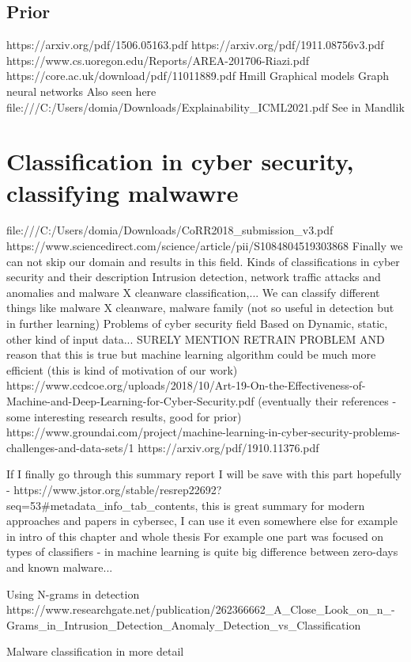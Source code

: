 \subsection{Prior}
https://arxiv.org/pdf/1506.05163.pdf
https://arxiv.org/pdf/1911.08756v3.pdf
https://www.cs.uoregon.edu/Reports/AREA-201706-Riazi.pdf
https://core.ac.uk/download/pdf/11011889.pdf
Hmill
Graphical models
Graph neural networks
    Also seen here file:///C:/Users/domia/Downloads/Explainability_ICML2021.pdf
See in Mandlik

\section{Classification in cyber security, classifying malwawre}
file:///C:/Users/domia/Downloads/CoRR2018_submission_v3.pdf
https://www.sciencedirect.com/science/article/pii/S1084804519303868
Finally we can not skip our domain and results in this field. 
Kinds of classifications in cyber security and their description
Intrusion detection, network traffic attacks and anomalies and malware X cleanware classification,...
We can classify different things like malware X cleanware, malware family (not so useful in detection but in further learning)
Problems of cyber security field
Based on Dynamic, static, other kind of input data...
SURELY MENTION RETRAIN PROBLEM AND reason that this is true but machine learning algorithm could be much more efficient (this is kind of motivation of our work)
https://www.ccdcoe.org/uploads/2018/10/Art-19-On-the-Effectiveness-of-Machine-and-Deep-Learning-for-Cyber-Security.pdf (eventually their references - some interesting research results, good for prior)
https://www.groundai.com/project/machine-learning-in-cyber-security-problems-challenges-and-data-sets/1
https://arxiv.org/pdf/1910.11376.pdf

If I finally go through this summary report I will be save with this part hopefully - https://www.jstor.org/stable/resrep22692?seq=53#metadata_info_tab_contents, this is great summary for modern approaches and papers in cybersec, I can use it even somewhere else for example in intro of this chapter and whole thesis
For example one part was focused on types of classifiers - in machine learning is quite big difference between zero-days and known malware...

Using N-grams in detection https://www.researchgate.net/publication/262366662_A_Close_Look_on_n_-Grams_in_Intrusion_Detection_Anomaly_Detection_vs_Classification

Malware classification in more detail

